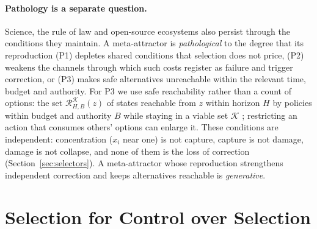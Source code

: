 \documentclass[letterpaper]{article} %
\theoremstyle{definition}
\begin{document}
\paragraph{Pathology is a separate question.} Science, the rule of law and open-source ecosystems also persist through the conditions they maintain. A meta-attractor is \emph{pathological} to the degree that its reproduction (P1) depletes shared conditions that selection does not price, (P2) weakens the channels through which such costs register as failure and trigger correction, or (P3) makes safe alternatives unreachable within the relevant time, budget and authority. For P3 we use safe reachability rather than a count of options: the set $\mathcal R^{\mathcal K}_{H,B}(z)$ of states reachable from $z$ within horizon $H$ by policies within budget and authority $B$ while staying in a viable set $\mathcal K$ \citep{krakovna2019,turner2020}; restricting an action that consumes others' options can enlarge it. These conditions are independent: concentration ($x_i$ near one) is not capture, capture is not damage, damage is not collapse, and none of them is the loss of correction (Section~\ref{sec:selectors}). A meta-attractor whose reproduction strengthens independent correction and keeps alternatives reachable is \emph{generative}.

\section{Selection for Control over Selection}\label{sec:capacity}
\end{document}
